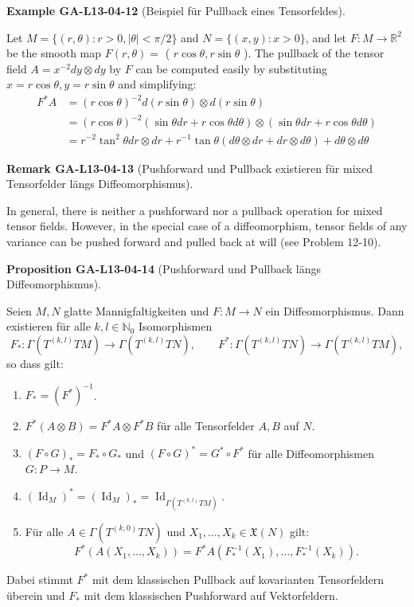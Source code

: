 \documentclass[10pt, letterpaper]{article}
\newcommand{\CustomHeading}[3]{%
  \par\medskip\noindent%
  \textbf{#1 #2} \textnormal{(#3)}.\enskip%
}
\newenvironment{PROP}[2]{\begin{unitbox}\CustomHeading{Proposition}{#1}{#2}}{\end{unitbox}}
\newenvironment{REM}[2]{\begin{unitbox}\CustomHeading{Remark}{#1}{#2}}{\end{unitbox}}
\newenvironment{EXA}[2]{\begin{unitbox}\CustomHeading{Example}{#1}{#2}}{\end{unitbox}}
\begin{document}
\begin{EXA}{GA-L13-04-12}{Beispiel für Pullback eines Tensorfeldes}
Let $M=\{(r, \theta): r>0,|\theta|<\pi / 2\}$ and $N=\{(x, y): x>0\}$, and let $F: M \rightarrow \mathbb{R}^{2}$ be the smooth map $F(r, \theta)=$ ( $r \cos \theta, r \sin \theta$ ). The pullback of the tensor field $A=x^{-2} d y \otimes d y$ by $F$ can be computed easily by substituting $x=r \cos \theta, y=r \sin \theta$ and simplifying:
$$
\begin{aligned}
F^{*} A & =(r \cos \theta)^{-2} d(r \sin \theta) \otimes d(r \sin \theta) \\
& =(r \cos \theta)^{-2}(\sin \theta d r+r \cos \theta d \theta) \otimes(\sin \theta d r+r \cos \theta d \theta) \\
& =r^{-2} \tan ^{2} \theta d r \otimes d r+r^{-1} \tan \theta(d \theta \otimes d r+d r \otimes d \theta)+d \theta \otimes d \theta
\end{aligned}
$$
\end{EXA}




\begin{REM}{GA-L13-04-13}{Pushforward und Pullback existieren für mixed Tensorfelder längs Diffeomorphismus}
In general, there is neither a pushforward nor a pullback operation for mixed tensor fields. However, in the special case of a diffeomorphism, tensor fields of any variance can be pushed forward and pulled back at will (see Problem 12-10).
\end{REM}


\begin{PROP}{GA-L13-04-14}{Pushforward und Pullback längs Diffeomorphismus}
Seien \( M, N \) glatte Mannigfaltigkeiten und \( F : M \to N \) ein Diffeomorphismus. Dann existieren für alle \( k, l \in \mathbb{N}_0 \) Isomorphismen
\[
F_* : \Gamma\left(T^{(k, l)} T M\right) \longrightarrow \Gamma\left(T^{(k, l)} T N\right), \qquad
F^* : \Gamma\left(T^{(k, l)} T N\right) \longrightarrow \Gamma\left(T^{(k, l)} T M\right),
\]
so dass gilt:
\begin{enumerate}[label=\roman*)]
    \item \( F_* = \left(F^*\right)^{-1} \).
    \item \( F^*(A \otimes B) = F^* A \otimes F^* B \) für alle Tensorfelder \( A, B \) auf \( N \).
    \item \( (F \circ G)_* = F_* \circ G_* \) und \( (F \circ G)^* = G^* \circ F^* \) für alle Diffeomorphismen \( G : P \to M \).
    \item \( (\operatorname{Id}_M)^* = (\operatorname{Id}_M)_* = \operatorname{Id}_{\Gamma(T^{(k, l)} T M)} \).
    \item Für alle \( A \in \Gamma(T^{(k, 0)} T N) \) und \( X_1, \dots, X_k \in \mathfrak{X}(N) \) gilt:
    \[
    F^*\left(A(X_1, \dots, X_k)\right) = F^* A \left(F_*^{-1}(X_1), \dots, F_*^{-1}(X_k)\right).
    \]
\end{enumerate}
Dabei stimmt \( F^* \) mit dem klassischen Pullback auf kovarianten Tensorfeldern überein und \( F_* \) mit dem klassischen Pushforward auf Vektorfeldern.
\end{PROP}
\end{document}
